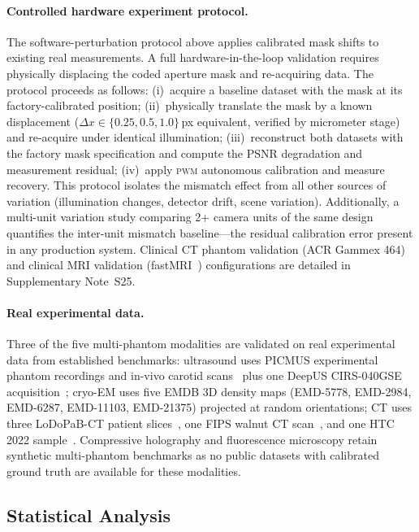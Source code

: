 \documentclass[11pt]{article}
\newcommand{\pwm}{\textsc{pwm}}
\begin{document}
\paragraph{Controlled hardware experiment protocol.}
The software-perturbation protocol above applies calibrated mask shifts to
existing real measurements.  A full hardware-in-the-loop validation
requires physically displacing the coded aperture mask and re-acquiring
data.  The protocol proceeds as follows: (i)~acquire a baseline dataset
with the mask at its factory-calibrated position; (ii)~physically translate
the mask by a known displacement ($\Delta x \in \{0.25, 0.5, 1.0\}$\,px
equivalent, verified by micrometer stage) and re-acquire under identical
illumination; (iii)~reconstruct both datasets with the factory mask
specification and compute the PSNR degradation and measurement residual;
(iv)~apply \pwm{} autonomous calibration and measure recovery.  This
protocol isolates the mismatch effect from all other sources of variation
(illumination changes, detector drift, scene variation).  Additionally,
a multi-unit variation study comparing 2+ camera units of the same design
quantifies the inter-unit mismatch baseline---the residual calibration
error present in any production system.  Clinical CT phantom validation
(ACR Gammex 464) and clinical MRI validation (fastMRI~\cite{zbontar2018fastmri})
configurations are detailed in Supplementary Note~S25.

\paragraph{Real experimental data.}
Three of the five multi-phantom modalities are validated on real
experimental data from established benchmarks: ultrasound uses PICMUS
experimental phantom recordings and in-vivo carotid
scans~\cite{liebgott2016picmus} plus one DeepUS CIRS-040GSE
acquisition~\cite{khan2020deepus}; cryo-EM uses five EMDB 3D density maps
(EMD-5778, EMD-2984, EMD-6287, EMD-11103, EMD-21375) projected at random
orientations; CT uses three LoDoPaB-CT patient
slices~\cite{leuschner2021lodopab}, one FIPS walnut \textmu CT
scan~\cite{hamalainen2015fips}, and one HTC\,2022
sample~\cite{meaney2022htc}.  Compressive holography and fluorescence
microscopy retain synthetic multi-phantom benchmarks as no public datasets
with calibrated ground truth are available for these modalities.

\subsection*{Statistical Analysis}
\label{sec:methods:statistics}
\end{document}
